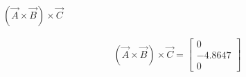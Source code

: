 $\left(\overrightarrow{A} \times \overrightarrow{B}\right) \times \overrightarrow{C}$

\begin{solution}
\begin{align*}
    \left(\overrightarrow{A} \times \overrightarrow{B}\right) \times \overrightarrow{C} = \begin{bmatrix}
        0 \\ -4.8647 \\ 0
    \end{bmatrix}
\end{align*}
\end{solution}